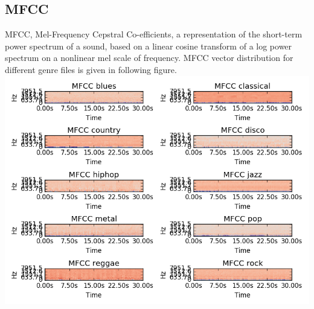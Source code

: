 \documentclass[conference]{IEEEtran}
\begin{document}
\subsection{MFCC}
MFCC, Mel-Frequency Cepstral Co-efficients, a representation of the short-term power spectrum of a sound, based on a linear cosine transform of a log power spectrum on a nonlinear mel scale of frequency\cite{wiki}.
MFCC vector distribution for different genre files is given in following figure.\\
\includegraphics[width=\columnwidth]{MFCC_fig}
%
%
\end{document}
